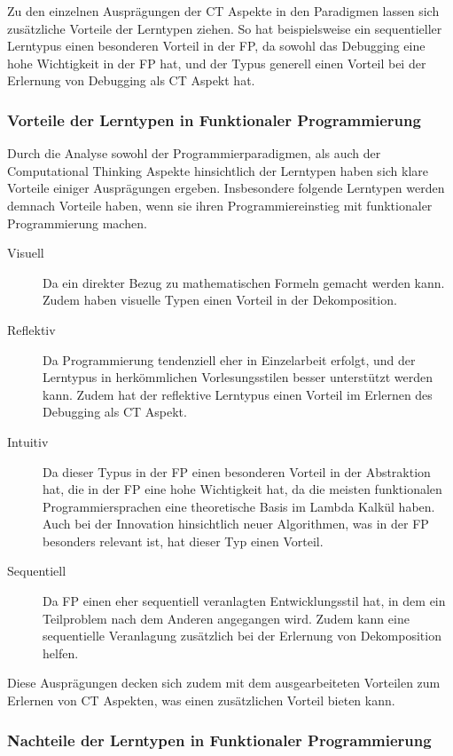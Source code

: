 Zu den einzelnen Ausprägungen der CT Aspekte in den Paradigmen lassen sich zusätzliche Vorteile der Lerntypen ziehen. So hat beispielsweise ein sequentieller Lerntypus einen besonderen Vorteil in der FP, da sowohl das Debugging eine hohe Wichtigkeit in der FP hat, und der Typus generell einen Vorteil bei der Erlernung von Debugging als CT Aspekt hat.

\subsubsection{Vorteile der Lerntypen in Funktionaler Programmierung}
Durch die Analyse sowohl der Programmierparadigmen, als auch der Computational Thinking Aspekte hinsichtlich der Lerntypen haben sich klare Vorteile einiger Ausprägungen ergeben.
Insbesondere folgende Lerntypen werden demnach Vorteile haben, wenn sie ihren Programmiereinstieg mit funktionaler Programmierung machen.

\begin{description}
    \item[Visuell] Da ein direkter Bezug zu mathematischen Formeln gemacht werden kann. Zudem haben visuelle Typen einen Vorteil in der Dekomposition.
    \item[Reflektiv] Da Programmierung tendenziell eher in Einzelarbeit erfolgt, und der Lerntypus in herkömmlichen Vorlesungsstilen besser unterstützt werden kann. Zudem hat der reflektive Lerntypus einen Vorteil im Erlernen des Debugging als CT Aspekt.
    \item[Intuitiv] Da dieser Typus in der FP einen besonderen Vorteil in der Abstraktion hat, die in der FP eine hohe Wichtigkeit hat, da die meisten funktionalen Programmiersprachen eine theoretische Basis im Lambda Kalkül haben. Auch bei der Innovation hinsichtlich neuer Algorithmen, was in der FP besonders relevant ist, hat dieser Typ einen Vorteil.
    \item[Sequentiell] Da FP einen eher sequentiell veranlagten Entwicklungsstil hat, in dem ein Teilproblem nach dem Anderen angegangen wird. Zudem kann eine sequentielle Veranlagung zusätzlich bei der Erlernung von Dekomposition helfen.
\end{description}

Diese Ausprägungen decken sich zudem mit dem ausgearbeiteten Vorteilen zum Erlernen von CT Aspekten, was einen zusätzlichen Vorteil bieten kann.
\\
\subsubsection{Nachteile der Lerntypen in Funktionaler Programmierung}

